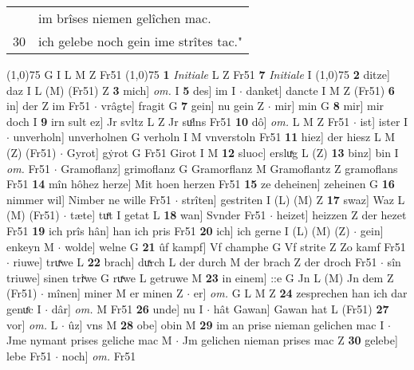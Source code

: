 \documentclass[8pt,a4paper,notitlepage]{article}
\begin{document}
\begin{table}[ht]
\begin{minipage}[t]{0.5\linewidth}
\begin{tabular}{rl}
 & im brîses niemen gelîchen mac.\\ 
30 & ich gelebe noch gein ime strîtes tac."\\ 
\end{tabular}
\scriptsize
\line(1,0){75} \newline
G I L M Z Fr51 \newline
\line(1,0){75} \newline
\textbf{1} \textit{Initiale} L Z Fr51  \textbf{7} \textit{Initiale} I  \newline
\line(1,0){75} \newline
\textbf{2} ditze] daz I L (M) (Fr51) Z \textbf{3} mich] \textit{om.} I \textbf{5} des] im I  $\cdot$ danket] dancte I M Z (Fr51) \textbf{6} in] der Z im Fr51  $\cdot$ vrâgte] fragit G \textbf{7} gein] nu gein Z  $\cdot$ mir] min G \textbf{8} mir] mir doch I \textbf{9} irn sult ez] Jr svltz L Z Jr suͦlns Fr51 \textbf{10} dô] \textit{om.} L M Z Fr51  $\cdot$ ist] ister I  $\cdot$ unverholn] unverholnen G verholn I M vnverstoln Fr51 \textbf{11} hiez] der hiesz L M (Z) (Fr51)  $\cdot$ Gyrot] gẏrot G Fr51 Girot I M \textbf{12} sluoc] ersluͯg L (Z) \textbf{13} binz] bin I \textit{om.} Fr51  $\cdot$ Gramoflanz] grimoflanz G Gramorflanz M Gramoflantz Z gramoflans Fr51 \textbf{14} mîn hôhez herze] Mit hoen herzen Fr51 \textbf{15} ze deheinen] zeheinen G \textbf{16} nimmer wil] Nimber ne wille Fr51  $\cdot$ strîten] gestriten I (L) (M) Z \textbf{17} swaz] Waz L (M) (Fr51)  $\cdot$ tæte] tuͤt I getat L \textbf{18} wan] Svnder Fr51  $\cdot$ heizet] heizzen Z der hezet Fr51 \textbf{19} ich prîs hân] han ich pris Fr51 \textbf{20} ich] ich gerne I (L) (M) (Z)  $\cdot$ gein] enkeyn M  $\cdot$ wolde] welne G \textbf{21} ûf kampf] Vf champhe G Vf strite Z Zo kamf Fr51  $\cdot$ riuwe] truͯwe L \textbf{22} brach] duͯrch L der durch M der brach Z der droch Fr51  $\cdot$ sîn triuwe] sinen triͮwe G ruͯwe L getruwe M \textbf{23} in einem] ::e G Jn L (M) Jn dem Z (Fr51)  $\cdot$ mînen] miner M er minen Z  $\cdot$ er] \textit{om.} G L M Z \textbf{24} zesprechen han ich dar genuͤc I  $\cdot$ dâr] \textit{om.} M Fr51 \textbf{26} unde] nu I  $\cdot$ hât Gawan] Gawan hat L (Fr51) \textbf{27} vor] \textit{om.} L  $\cdot$ ûz] vns M \textbf{28} obe] obin M \textbf{29} im an prise nieman gelichen mac I  $\cdot$ Jme nymant prises geliche mac M  $\cdot$ Jm gelichen nieman prises mac Z \textbf{30} gelebe] lebe Fr51  $\cdot$ noch] \textit{om.} Fr51 \newline
\end{minipage}
\hspace{0.5cm}

\end{table}
\end{document}

